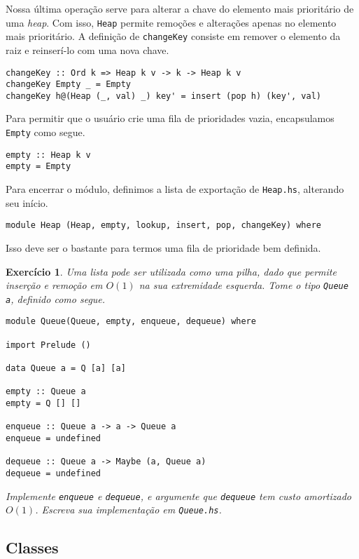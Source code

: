 \documentclass[a4paper]{article}
\newtheorem{exercicio}{Exercício}
\begin{document}
Nossa última operação serve para alterar a chave do elemento mais prioritário de uma \emph{heap}.
Com isso, \texttt{Heap} permite remoções e alterações apenas no elemento mais prioritário.
A definição de \texttt{changeKey} consiste em remover o elemento da raiz e reinserí-lo com uma nova chave.

\begin{verbatim}
changeKey :: Ord k => Heap k v -> k -> Heap k v
changeKey Empty _ = Empty
changeKey h@(Heap (_, val) _) key' = insert (pop h) (key', val)
\end{verbatim}

Para permitir que o usuário crie uma fila de prioridades vazia, encapsulamos \texttt{Empty} como segue.

\begin{verbatim}
empty :: Heap k v
empty = Empty
\end{verbatim}

Para encerrar o módulo, definimos a lista de exportação de \texttt{Heap.hs}, alterando seu início.

\begin{verbatim}
module Heap (Heap, empty, lookup, insert, pop, changeKey) where
\end{verbatim}

Isso deve ser o bastante para termos uma fila de prioridade bem definida. 

\begin{exercicio}
	Uma lista pode ser utilizada como uma pilha, dado que permite inserção e remoção em $O(1)$ na sua extremidade esquerda.
	Tome o tipo \emph{\texttt{Queue a}}, definido como segue.
	\begin{verbatim}
module Queue(Queue, empty, enqueue, dequeue) where

import Prelude ()

data Queue a = Q [a] [a]

empty :: Queue a
empty = Q [] []

enqueue :: Queue a -> a -> Queue a
enqueue = undefined

dequeue :: Queue a -> Maybe (a, Queue a)
dequeue = undefined
	\end{verbatim}
	Implemente \emph{\texttt{enqueue}} e \emph{\texttt{dequeue}}, e argumente que \emph{\texttt{dequeue}} tem custo amortizado $O(1)$.
	Escreva sua implementação em \emph{\texttt{Queue.hs}}.
\end{exercicio}

\subsection{Classes}
\end{document}

